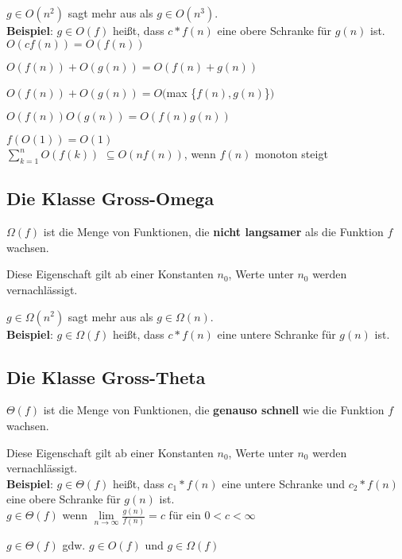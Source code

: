 \documentclass[12pt]{article}
\begin{document}
$g \in O(n^2)$ sagt mehr aus als $g \in O(n^3)$.\\

\textbf{Beispiel}: $g \in O(f)$ heißt, dass $c * f(n)$ eine obere Schranke für $g(n)$ ist.\\

$O(cf(n)) = O(f(n))$

$O(f(n)) + O(g(n)) = O(f(n) + g(n))$

$O(f(n)) + O(g(n)) = O($max \{$f(n), g(n)$\}$)$

$O(f(n))O(g(n)) = O(f(n)g(n))$

$f(O(1)) = O(1)$\\

$\sum_{k=1}^n O(f(k))$ $\subseteq O(nf(n))$, wenn $f(n)$ monoton steigt

\subsection{Die Klasse Gross-Omega}

$\Omega(f)$ ist die Menge von Funktionen, die \textbf{nicht langsamer} als die Funktion $f$ wachsen.

Diese Eigenschaft gilt ab einer Konstanten $n_0$, Werte unter $n_0$ werden vernachlässigt.

$g \in \Omega(n^2)$ sagt mehr aus als $g \in \Omega(n)$.\\

\textbf{Beispiel}: $g \in \Omega(f)$ heißt, dass $c * f(n)$ eine untere Schranke für $g(n)$ ist.\\

\subsection{Die Klasse Gross-Theta}

$\Theta(f)$ ist die Menge von Funktionen, die \textbf{genauso schnell} wie die Funktion $f$ wachsen.

Diese Eigenschaft gilt ab einer Konstanten $n_0$, Werte unter $n_0$ werden vernachlässigt.\\

\textbf{Beispiel}: $g \in \Theta(f)$ heißt, dass $c_1 * f(n)$ eine untere Schranke und $c_2 * f(n)$ eine obere Schranke für $g(n)$ ist.\\

$g \in \Theta(f)$ wenn \(\lim\limits_{n \to \infty}\frac{g(n)}{f(n)}=c\) für ein $0 < c < \infty$

$g \in \Theta(f)$ gdw. $g \in O(f)$ und $g \in \Omega(f)$
\end{document}
